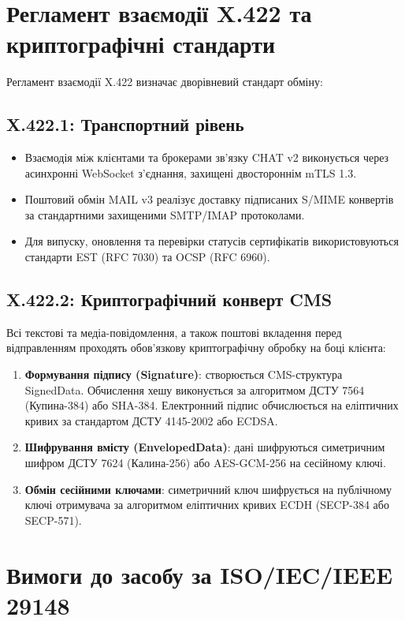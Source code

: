 \documentclass{article}
\begin{document}
\newpage
\section{Регламент взаємодії X.422 та криптографічні стандарти}

Регламент взаємодії X.422 визначає дворівневий стандарт обміну:

\subsection{X.422.1: Транспортний рівень}
\begin{itemize}
    \item Взаємодія між клієнтами та брокерами зв'язку CHAT v2 виконується через асинхронні WebSocket з'єднання, захищені двостороннім mTLS 1.3.
    \item Поштовий обмін MAIL v3 реалізує доставку підписаних S/MIME конвертів за стандартними захищеними SMTP/IMAP протоколами.
    \item Для випуску, оновлення та перевірки статусів сертифікатів використовуються стандарти EST (RFC 7030) та OCSP (RFC 6960).
\end{itemize}

\subsection{X.422.2: Криптографічний конверт CMS}
Всі текстові та медіа-повідомлення, а також поштові вкладення перед відправленням проходять обов'язкову криптографічну обробку на боці клієнта:
\begin{enumerate}
    \item \textbf{Формування підпису (Signature)}: створюється CMS-структура SignedData. Обчислення хешу виконується за алгоритмом ДСТУ 7564 (Купина-384) або SHA-384. Електронний підпис обчислюється на еліптичних кривих за стандартом ДСТУ 4145-2002 або ECDSA.
    \item \textbf{Шифрування вмісту (EnvelopedData)}: дані шифруються симетричним шифром ДСТУ 7624 (Калина-256) або AES-GCM-256 на сесійному ключі.
    \item \textbf{Обмін сесійними ключами}: симетричний ключ шифрується на публічному ключі отримувача за алгоритмом еліптичних кривих ECDH (SECP-384 або SECP-571).
\end{enumerate}

\newpage
\section{Вимоги до засобу за ISO/IEC/IEEE 29148}
\end{document}
